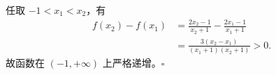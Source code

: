 任取 $-1<x_1<x_2$，有
\[
\begin{aligned}
f(x_2)-f(x_1)
&=\frac{2x_2-1}{x_2+1}-\frac{2x_1-1}{x_1+1}\\
&=\frac{3(x_2-x_1)}{(x_1+1)(x_2+1)}>0.
\end{aligned}
\]
故函数在 $(-1,+\infty)$ 上严格递增。$\square$
